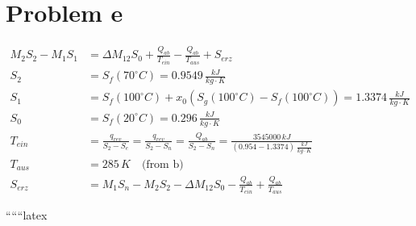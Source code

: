 \section*{Problem e}

\begin{align*}
M_2 S_2 - M_1 S_1 &= \Delta M_{12} S_0 + \frac{Q_{ab}}{T_{ein}} - \frac{Q_{ab}}{T_{aus}} + S_{erz} \\
S_2 &= S_f(70^\circ C) = 0.9549 \, \frac{kJ}{kg \cdot K} \\
S_1 &= S_f(100^\circ C) + x_0 \left( S_g(100^\circ C) - S_f(100^\circ C) \right) = 1.3374 \, \frac{kJ}{kg \cdot K} \\
S_0 &= S_f(20^\circ C) = 0.296 \, \frac{kJ}{kg \cdot K} \\
T_{ein} &= \frac{q_{rev}}{S_2 - S_e} = \frac{q_{rev}}{S_2 - S_n} = \frac{Q_{ab}}{S_2 - S_n} = \frac{3545000 \, kJ}{(0.954 - 1.3374) \, \frac{kJ}{kg \cdot K}} \\
T_{aus} &= 285 \, K \quad \text{(from b)} \\
S_{erz} &= M_1 S_n - M_2 S_2 - \Delta M_{12} S_0 - \frac{Q_{ab}}{T_{ein}} + \frac{Q_{ab}}{T_{aus}}
\end{align*}

``````latex